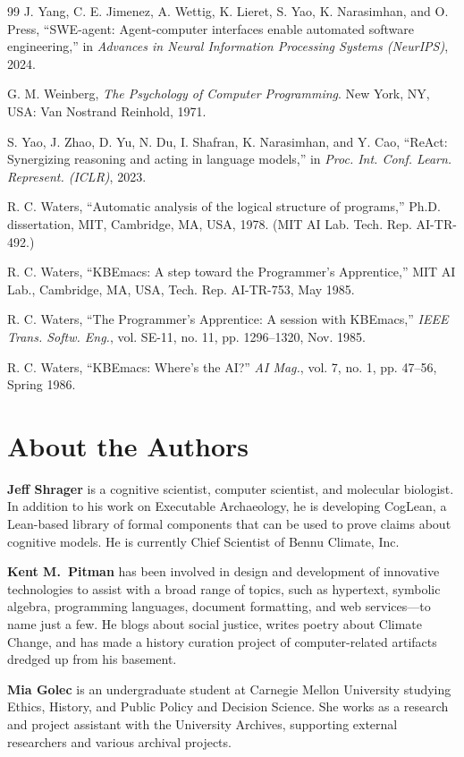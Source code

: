 \documentclass[11pt]{article}
\begin{document}
\begin{thebibliography}{99}
 J. Yang, C. E. Jimenez, A. Wettig, K. Lieret,
  S. Yao, K. Narasimhan, and O. Press, ``SWE-agent: Agent-computer
  interfaces enable automated software engineering,'' in
  \textit{Advances in Neural Information Processing Systems (NeurIPS)},
  2024.

 G. M. Weinberg, \textit{The Psychology of
  Computer Programming}. New York, NY, USA: Van Nostrand Reinhold, 1971.

 S. Yao, J. Zhao, D. Yu, N. Du, I. Shafran,
  K. Narasimhan, and Y. Cao, ``ReAct: Synergizing reasoning and acting
  in language models,'' in \textit{Proc. Int. Conf. Learn. Represent.
  (ICLR)}, 2023.

 R. C. Waters, ``Automatic analysis of the logical
  structure of programs,'' Ph.D. dissertation, MIT, Cambridge, MA, USA,
  1978. (MIT AI Lab. Tech. Rep. AI-TR-492.)

 R. C. Waters, ``KBEmacs: A step toward the
  Programmer's Apprentice,'' MIT AI Lab., Cambridge, MA, USA, Tech. Rep.
  AI-TR-753, May 1985.

 R. C. Waters, ``The Programmer's Apprentice: A
  session with KBEmacs,'' \textit{IEEE Trans. Softw. Eng.}, vol. SE-11,
  no. 11, pp. 1296--1320, Nov. 1985.

 R. C. Waters, ``KBEmacs: Where's the AI?''
  \textit{AI Mag.}, vol. 7, no. 1, pp. 47--56, Spring 1986.

\end{thebibliography}

\section*{About the Authors}

\noindent\textbf{Jeff Shrager} is a cognitive scientist, computer
scientist, and molecular biologist. In addition to his work on
Executable Archaeology, he is developing CogLean, a Lean-based library
of formal components that can be used to prove claims about cognitive
models. He is currently Chief Scientist of Bennu Climate, Inc.

\noindent\textbf{Kent M.~Pitman} has been involved in design and
development of innovative technologies to assist with a broad range of
topics, such as hypertext, symbolic algebra, programming languages,
document formatting, and web services---to name just a few. He blogs
about social justice, writes poetry about Climate Change, and has made
a history curation project of computer-related artifacts dredged up
from his basement.

\noindent\textbf{Mia Golec} is an undergraduate student at
Carnegie Mellon University studying Ethics, History, and Public Policy
and Decision Science. She works as a research and project assistant
with the University Archives, supporting external researchers and
various archival projects.
\end{document}
